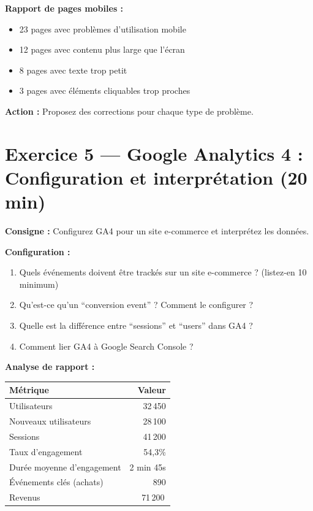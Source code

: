 \documentclass[12pt,a4paper]{report}
\begin{document}
\textbf{Rapport de pages mobiles :}
\begin{itemize}
    \item 23 pages avec probl\`{e}mes d'utilisation mobile
    \item 12 pages avec contenu plus large que l'\'{e}cran
    \item 8 pages avec texte trop petit
    \item 3 pages avec \'{e}l\'{e}ments cliquables trop proches
\end{itemize}

\textbf{Action :} Proposez des corrections pour chaque type de probl\`{e}me.

\section{Exercice 5 --- Google Analytics 4 : Configuration et interpr\'{e}tation (20 min)}

\textbf{Consigne :} Configurez GA4 pour un site e-commerce et interpr\'{e}tez les donn\'{e}es.

\textbf{Configuration :}
\begin{enumerate}
    \item Quels \'{e}v\'{e}nements doivent \^{e}tre track\'{e}s sur un site e-commerce ? (listez-en 10 minimum)
    \item Qu'est-ce qu'un ``conversion event'' ? Comment le configurer ?
    \item Quelle est la diff\'{e}rence entre ``sessions'' et ``users'' dans GA4 ?
    \item Comment lier GA4 \`{a} Google Search Console ?
\end{enumerate}

\textbf{Analyse de rapport :}
\begin{longtable}{lr}
\toprule
M\'{e}trique & Valeur \\
\midrule
\endhead
\bottomrule
\endfoot
Utilisateurs & 32\,450 \\
Nouveaux utilisateurs & 28\,100 \\
Sessions & 41\,200 \\
Taux d'engagement & 54,3\% \\
Dur\'{e}e moyenne d'engagement & 2 min 45s \\
\'{E}v\'{e}nements cl\'{e}s (achats) & 890 \\
Revenus & 71\,200\,\texteuro{} \\
\bottomrule
\end{longtable}
\end{document}
